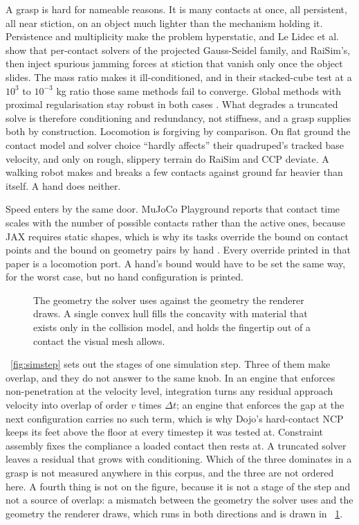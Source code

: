 A grasp is hard for nameable reasons. It is many contacts at once, all persistent, all near
stiction, on an object much lighter than the mechanism holding it. Persistence and multiplicity
make the problem hyperstatic, and Le Lidec et al. show that per-contact solvers of the projected
Gauss-Seidel family, and RaiSim's, then inject spurious jamming forces at stiction that vanish
only once the object slides. The mass ratio makes it ill-conditioned, and in their stacked-cube
test at a $10^{3}$ to $10^{-3}$ kg ratio those same methods fail to converge. Global methods with
proximal regularisation stay robust in both cases
\cite[Sec.~IV-A]{contact_models_comparison_2023}. What degrades a truncated solve is therefore
conditioning and redundancy, not stiffness, and a grasp supplies both by construction. Locomotion
is forgiving by comparison. On flat ground the contact model and solver choice ``hardly affects''
their quadruped's tracked base velocity, and only on rough, slippery terrain do RaiSim and CCP
deviate. A walking robot makes and breaks a few contacts against ground far heavier than itself. A
hand does neither.

Speed enters by the same door. MuJoCo Playground reports that contact time scales with the number
of possible contacts rather than the active ones, because JAX requires static shapes, which is why
its tasks override the bound on contact points and the bound on geometry pairs by hand
\cite[Sec.~VI]{mujoco_playground_2025}. Every override printed in that paper is a locomotion port.
A hand's bound would have to be set the same way, for the worst case, but no hand configuration is
printed.

\begin{figure}[!t]
  \centering
  \caption{The geometry the solver uses against the geometry the renderer draws. A single convex
  hull fills the concavity with material that exists only in the collision model, and holds the
  fingertip out of a contact the visual mesh allows.}
  \label{fig:collision}
\end{figure}

\figurename~\ref{fig:simstep} sets out the stages of one simulation step. Three of them make
overlap, and they do not answer to the same knob. In an engine that enforces non-penetration at
the velocity level, integration turns any residual approach velocity into overlap of order $v$
times $\Delta t$; an engine that enforces the gap at the next configuration carries no such
term, which is why Dojo's hard-contact NCP keeps its feet above the floor at every timestep it
was tested at. Constraint assembly fixes the compliance a loaded contact then rests at. A
truncated solver leaves a residual that grows with conditioning. Which of the three dominates
in a grasp is not measured anywhere in this corpus, and the three are not ordered here. A
fourth thing is not on the figure, because it is not a stage of the step and not a source of
overlap: a mismatch between the geometry the solver uses and the geometry the renderer draws,
which runs in both directions and is drawn in \figurename~\ref{fig:collision}.

